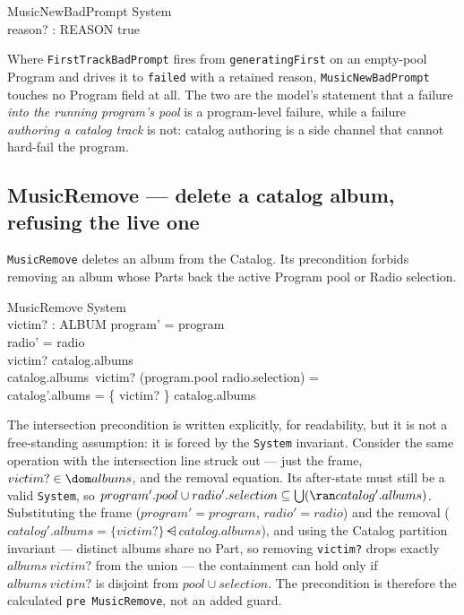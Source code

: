 \documentclass[a4paper,10pt,fleqn]{article}
\begin{document}
\begin{schema}{MusicNewBadPrompt}
  \Xi System \\
  reason? : REASON
  \where
  true
\end{schema}

Where \texttt{FirstTrackBadPrompt} fires from \texttt{generatingFirst} on an
empty-pool Program and drives it to \texttt{failed} with a retained reason,
\texttt{MusicNewBadPrompt} touches no Program field at all. The two are the
model's statement that a failure \emph{into the running program's pool} is a
program-level failure, while a failure \emph{authoring a catalog track} is not:
catalog authoring is a side channel that cannot hard-fail the program.

\subsection{MusicRemove --- delete a catalog album, refusing the live one}
\label{sec:removederived}

\texttt{MusicRemove} deletes an album from the Catalog. Its precondition forbids
removing an album whose Parts back the active Program pool or Radio selection.

\begin{schema}{MusicRemove}
  \Delta System \\
  victim? : ALBUM
  \where
  program' = program \\
  radio' = radio \\
  victim? \in \dom catalog.albums \\
  catalog.albums~victim? \cap (program.pool \cup radio.selection) = \emptyset \\
  catalog'.albums = \{ victim? \} \ndres catalog.albums
\end{schema}

The intersection precondition is written explicitly, for readability, but it is
not a free-standing assumption: it is forced by the \texttt{System} invariant.
Consider the same operation with the intersection line struck out --- just the
frame, $victim? \in \dom albums$, and the removal equation. Its after-state must
still be a valid \texttt{System}, so
$program'.pool \cup radio'.selection \subseteq \bigcup (\ran catalog'.albums)$.
Substituting the frame ($program' = program$, $radio' = radio$) and the removal
($catalog'.albums = \{victim?\} \ndres catalog.albums$), and using the Catalog
partition invariant --- distinct albums share no Part, so removing
\texttt{victim?} drops exactly $albums~victim?$ from the union --- the
containment can hold only if $albums~victim?$ is disjoint from
$pool \cup selection$. The precondition is therefore the calculated
\texttt{pre}~\texttt{MusicRemove}, not an added guard.
\end{document}
